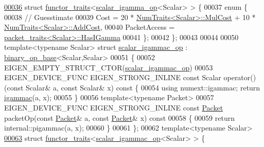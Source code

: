 \begin{DoxyCode}
\hyperlink{struct_eigen_1_1internal_1_1functor__traits_3_01scalar__igamma__op_3_01_scalar_01_4_01_4}{00036} \textcolor{keyword}{struct }\hyperlink{struct_eigen_1_1internal_1_1functor__traits}{functor\_traits}<\hyperlink{struct_eigen_1_1internal_1_1scalar__igamma__op}{scalar\_igamma\_op}<Scalar> > \{
00037   \textcolor{keyword}{enum} \{
00038     \textcolor{comment}{// Guesstimate}
00039     Cost = 20 * \hyperlink{group___core___module_struct_eigen_1_1_num_traits}{NumTraits<Scalar>::MulCost} + 10 * 
      \hyperlink{group___core___module_struct_eigen_1_1_num_traits}{NumTraits<Scalar>::AddCost},
00040     PacketAccess = \hyperlink{struct_eigen_1_1internal_1_1packet__traits}{packet\_traits<Scalar>::HasIGamma}
00041   \};
00042 \};
00043 
00044 
00050 \textcolor{keyword}{template}<\textcolor{keyword}{typename} Scalar> \textcolor{keyword}{struct }\hyperlink{struct_eigen_1_1internal_1_1scalar__igammac__op}{scalar\_igammac\_op} : 
      \hyperlink{struct_eigen_1_1internal_1_1binary__op__base}{binary\_op\_base}<Scalar,Scalar>
00051 \{
00052   EIGEN\_EMPTY\_STRUCT\_CTOR(\hyperlink{struct_eigen_1_1internal_1_1scalar__igammac__op}{scalar\_igammac\_op})
00053   EIGEN\_DEVICE\_FUNC EIGEN\_STRONG\_INLINE \textcolor{keyword}{const} Scalar operator() (\textcolor{keyword}{const} Scalar& a, \textcolor{keyword}{const} Scalar& x)\textcolor{keyword}{ const }\{
00054     \textcolor{keyword}{using} numext::igammac; \textcolor{keywordflow}{return} \hyperlink{namespace_eigen_a1abaa2ff8c7b1871eaf026a47c6bbf3b}{igammac}(a, x);
00055   \}
00056   \textcolor{keyword}{template}<\textcolor{keyword}{typename} Packet>
00057   EIGEN\_DEVICE\_FUNC EIGEN\_STRONG\_INLINE \textcolor{keyword}{const} \hyperlink{union_eigen_1_1internal_1_1_packet}{Packet} packetOp(\textcolor{keyword}{const} \hyperlink{union_eigen_1_1internal_1_1_packet}{Packet}& a, \textcolor{keyword}{const} 
      \hyperlink{union_eigen_1_1internal_1_1_packet}{Packet}& x)\textcolor{keyword}{ const}
00058 \textcolor{keyword}{  }\{
00059     \textcolor{keywordflow}{return} internal::pigammac(a, x);
00060   \}
00061 \};
00062 \textcolor{keyword}{template}<\textcolor{keyword}{typename} Scalar>
\hyperlink{struct_eigen_1_1internal_1_1functor__traits_3_01scalar__igammac__op_3_01_scalar_01_4_01_4}{00063} \textcolor{keyword}{struct }\hyperlink{struct_eigen_1_1internal_1_1functor__traits}{functor\_traits}<\hyperlink{struct_eigen_1_1internal_1_1scalar__igammac__op}{scalar\_igammac\_op}<Scalar> > \{

\end{DoxyCode}
